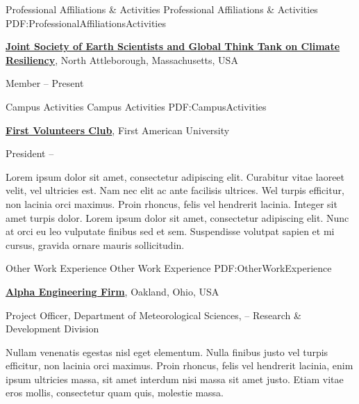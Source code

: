 \documentclass[letterpaper,MMMyyyy,nonstopmode]{simpleresumecv}
\begin{document}
\begin{Body}

  \Section
  {Professional Affiliations\newline
  \& Activities}
  {Professional Affiliations \& Activities}
  {PDF:ProfessionalAffiliationsActivities}

  \Entry
    \href{http://www.example.com/my-society}
    {\textbf{Joint Society of Earth Scientists and Global Think Tank on Climate Resiliency}},
    \newline
    North Attleborough, Massachusetts, USA

  \Gap
    \BulletItem
      Member
      \hfill
       --
      Present


  \newpage
  \Section
  {Campus Activities}
  {Campus Activities}
  {PDF:CampusActivities}

  \Entry
  \href{http://www.example.com/my-club}
  {\textbf{First Volunteers Club}},
  First American University

  \Gap
    \BulletItem
      President
      \hfill
       --
      \begin{Detail}
        \SubBulletItem
        Lorem ipsum dolor sit amet, consectetur adipiscing elit.
        \SubBulletItem
          Curabitur vitae laoreet velit, vel ultricies est. Nam nec elit ac ante  facilisis ultrices.
        \SubSubBulletItem
          Wel turpis efficitur, non lacinia orci maximus.
        \SubSubBulletItem
          Proin rhoncus, felis vel hendrerit lacinia.
        \SubBulletItem
          Integer sit amet turpis dolor. Lorem ipsum dolor sit amet, consectetur  adipiscing elit. Nunc at orci eu leo vulputate finibus sed et sem.
        \SubBulletItem
          Suspendisse volutpat sapien et mi cursus, gravida ornare mauris   sollicitudin.
      \end{Detail}


  \Section
  {Other Work\newline
  Experience}
  {Other Work Experience}
  {PDF:OtherWorkExperience}

  \Entry
    \href{http://www.example.com/my-company}
    {\textbf{Alpha Engineering Firm}},
    Oakland, Ohio, USA

  \Gap
    \BulletItem
      Project Officer,
      Department of Meteorological Sciences,
      \hfill
       --
      \newline
      Research \& Development Division
      \begin{Detail}
        \SubBulletItem
          Nullam venenatis egestas nisl eget elementum.
        \SubBulletItem
          Nulla finibus justo vel turpis efficitur, non lacinia orci maximus. Proin rhoncus, felis vel hendrerit lacinia, enim ipsum ultricies massa, sit amet interdum nisi massa sit amet justo.
        \SubBulletItem
          Etiam vitae eros mollis, consectetur quam quis, molestie massa.
      \end{Detail}


\end{Body}
\end{document}
